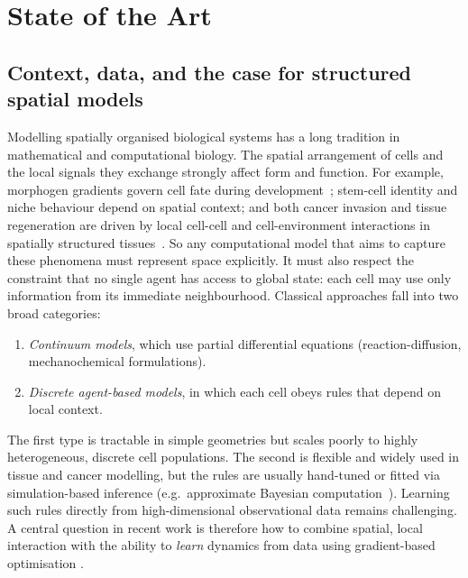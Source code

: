 \chapter{State of the Art}
\label{c:sota}

\section{Context, data, and the case for structured spatial models}
\label{sec:sota:context}

Modelling spatially organised biological systems has a long tradition in mathematical and computational biology. The spatial arrangement of cells and the local signals they exchange strongly affect form and function. For example, morphogen gradients govern cell fate during development~\cite{rogers2011morphogen}; stem-cell identity and niche behaviour depend on spatial context; and both cancer invasion and tissue regeneration are driven by local cell-cell and cell-environment interactions in spatially structured tissues~\cite{noble2022spatial,seferbekova2023spatial}. So any computational model that aims to capture these phenomena must represent space explicitly. It must also respect the constraint that no single agent has access to global state: each cell may use only information from its immediate neighbourhood.
Classical approaches fall into two broad categories:
\begin{enumerate}
  \item \emph{Continuum models}, which use partial differential equations (reaction-diffusion, mechanochemical formulations).
  \item \emph{Discrete agent-based models}, in which each cell obeys rules that depend on local context.
\end{enumerate}
The first type is tractable in simple geometries but scales poorly to highly heterogeneous, discrete cell populations. The second is flexible and widely used in tissue and cancer modelling, but the rules are usually hand-tuned or fitted via simulation-based inference (e.g.\ approximate Bayesian computation~\cite{beaumont2002abc,sisson2018abc}). Learning such rules directly from high-dimensional observational data remains challenging. A central question in recent work is therefore how to combine spatial, local interaction with the ability to \emph{learn} dynamics from data using gradient-based optimisation \cite{mnca_milite2025}.

